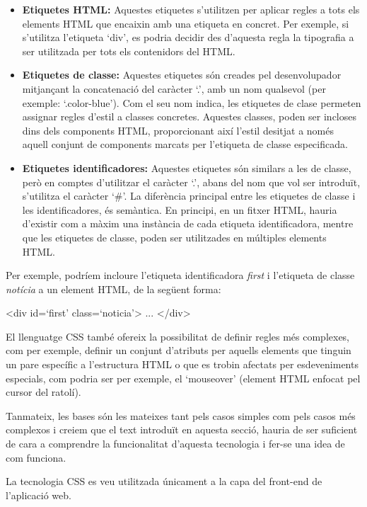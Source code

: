     \begin{itemize}
        \item \textbf{Etiquetes HTML:}  Aquestes etiquetes s'utilitzen per aplicar regles a tots els elements HTML que encaixin amb una etiqueta en concret. Per exemple, si s'utilitza l'etiqueta `div', es podria decidir des d’aquesta regla la tipografia a ser utilitzada per tots els contenidors del HTML.
        \item \textbf{Etiquetes de classe:} Aquestes etiquetes són creades pel desenvolupador mitjançant la concatenació del caràcter `.', amb un nom qualsevol (per exemple: `.color-blue’). Com el seu nom indica, les etiquetes de clase permeten assignar regles d'estil a classes concretes. Aquestes classes, poden ser incloses dins dels components HTML, proporcionant així l'estil desitjat a només aquell conjunt de components marcats per l'etiqueta de classe especificada.
        \item \textbf{Etiquetes identificadores:} Aquestes etiquetes són similars a les de classe, però en comptes d'utilitzar el caràcter `.', abans del nom que vol ser introduït, s'utilitza el caràcter `\#'. La diferència principal entre les etiquetes de classe i les identificadores, és semàntica. En principi, en un fitxer HTML, hauria d’existir com a màxim una instància de cada etiqueta identificadora, mentre que les etiquetes de classe, poden ser utilitzades en múltiples elements HTML.
    \end{itemize}

    Per exemple, podríem incloure l’etiqueta identificadora \emph{first} i l’etiqueta de classe \emph{notícia} a un element HTML, de la següent forma:

    \begin{displayquote}
        <div id=`first’ class=`noticia’> ... </div>
    \end{displayquote}

    El llenguatge CSS també ofereix la possibilitat de definir regles més complexes, com per exemple, definir un conjunt d'atributs per aquells elements que tinguin un pare específic a l’estructura HTML o que es trobin afectats per esdeveniments especials, com podria ser per exemple, el `mouseover’ (element HTML enfocat pel cursor del ratolí).

    Tanmateix, les bases són les mateixes tant pels casos simples com pels casos més complexos i creiem que el text introduït en aquesta secció, hauria de ser suficient de cara a comprendre la funcionalitat d'aquesta tecnologia i fer-se una idea de com funciona.

    La tecnologia CSS es veu utilitzada únicament a la capa del front-end de l'aplicació web.
